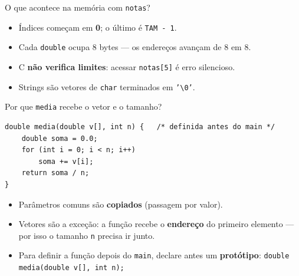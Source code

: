 \documentclass[aspectratio=169]{beamer}
\begin{document}
\begin{frame}{O que acontece na memória com \texttt{notas}?}
  \begin{center}
  \end{center}
  \begin{itemize}
    \item Índices começam em \textbf{0}; o último é \texttt{TAM - 1}.
    \item Cada \texttt{double} ocupa 8 bytes --- os endereços avançam de 8 em 8.
    \item C \textbf{não verifica limites}: acessar \texttt{notas[5]} é erro silencioso.
    \item Strings são vetores de \texttt{char} terminados em \texttt{'\textbackslash 0'}.
  \end{itemize}
\end{frame}

\begin{frame}[fragile]{Por que \texttt{media} recebe o vetor e o tamanho?}
\begin{lstlisting}
double media(double v[], int n) {   /* definida antes do main */
    double soma = 0.0;
    for (int i = 0; i < n; i++)
        soma += v[i];
    return soma / n;
}
\end{lstlisting}
  \begin{itemize}
    \item Parâmetros comuns são \textbf{copiados} (passagem por valor).
    \item Vetores são a exceção: a função recebe o \textbf{endereço} do primeiro
      elemento --- por isso o tamanho \texttt{n} precisa ir junto.
    \item Para definir a função depois do \texttt{main}, declare antes um
      \textbf{protótipo}: \texttt{double media(double v[], int n);}
  \end{itemize}
\end{frame}
\end{document}

